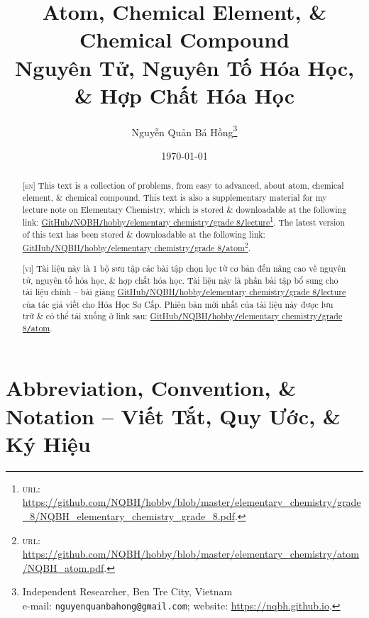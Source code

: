 \documentclass{article}
\title{Atom, Chemical Element, \& Chemical Compound\\Nguyên Tử, Nguyên Tố Hóa Học, \& Hợp Chất Hóa Học}
\author{Nguyễn Quản Bá Hồng\footnote{Independent Researcher, Ben Tre City, Vietnam\\e-mail: \texttt{nguyenquanbahong@gmail.com}; website: \url{https://nqbh.github.io}.}}
\date{\today}
\begin{document}
\maketitle
\begin{abstract}
	\textsc{[en]} This text is a collection of problems, from easy to advanced, about atom, chemical element, \& chemical compound. This text is also a supplementary material for my lecture note on Elementary Chemistry, which is stored \& downloadable at the following link: \href{https://github.com/NQBH/hobby/blob/master/elementary_chemistry/grade_8/NQBH_elementary_chemistry_grade_8.pdf}{GitHub\texttt{/}NQBH\texttt{/}hobby\texttt{/}elementary chemistry\texttt{/}grade 8\texttt{/}lecture}\footnote{\textsc{url}: \url{https://github.com/NQBH/hobby/blob/master/elementary_chemistry/grade_8/NQBH_elementary_chemistry_grade_8.pdf}.}. The latest version of this text has been stored \& downloadable at the following link: \href{https://github.com/NQBH/hobby/blob/master/elementary_chemistry/chemical_reaction/NQBH_chemical_reaction.pdf}{GitHub\texttt{/}NQBH\texttt{/}hobby\texttt{/}elementary chemistry\texttt{/}grade 8\texttt{/}atom}\footnote{\textsc{url}: \url{https://github.com/NQBH/hobby/blob/master/elementary_chemistry/atom/NQBH_atom.pdf}.}.
	\vspace{2mm}
	
	\textsc{[vi]} Tài liệu này là 1 bộ sưu tập các bài tập chọn lọc từ cơ bản đến nâng cao về nguyên tử, nguyên tố hóa học, \& hợp chất hóa học. Tài liệu này là phần bài tập bổ sung cho tài liệu chính -- bài giảng \href{https://github.com/NQBH/hobby/blob/master/elementary_chemistry/grade_8/NQBH_elementary_chemistry_grade_8.pdf}{GitHub\texttt{/}NQBH\texttt{/}hobby\texttt{/}elementary chemistry\texttt{/}grade 8\texttt{/}lecture} của tác giả viết cho Hóa Học Sơ Cấp. Phiên bản mới nhất của tài liệu này được lưu trữ \& có thể tải xuống ở link sau: \href{https://github.com/NQBH/hobby/blob/master/elementary_chemistry/grade_8/real/NQBH_real.pdf}{GitHub\texttt{/}NQBH\texttt{/}hobby\texttt{/}elementary chemistry\texttt{/}grade 8\texttt{/}atom}.
\end{abstract}
\setcounter{secnumdepth}{4}
\setcounter{tocdepth}{3}
\tableofcontents
\newpage


\section*{Abbreviation, Convention, \& Notation -- Viết Tắt, Quy Ước, \& Ký Hiệu}
\end{document}
